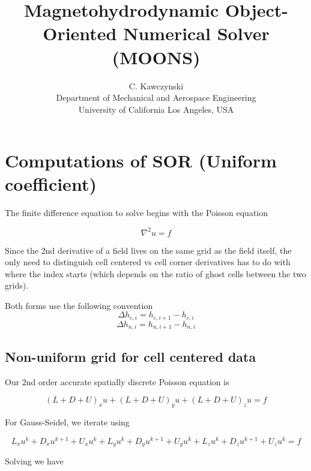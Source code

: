 \documentclass[11pt]{article}
\begin{document}
\doublespacing
\title{Magnetohydrodynamic Object-Oriented Numerical Solver (MOONS)}
\author{C. Kawczynski \\
Department of Mechanical and Aerospace Engineering \\
University of California Los Angeles, USA\\
}
\maketitle

\section{Computations of SOR (Uniform coefficient)}
The finite difference equation to solve begins with the Poisson equation


\begin{equation}
	\nabla^2 u = f
\end{equation}

Since the 2nd derivative of a field lives on the same grid as the field itself, the only need to distinguish cell centered vs cell corner derivatives has to do with where the index starts (which depends on the ratio of ghost cells between the two grids).

Both forms use the following convention
\begin{equation}
	\Delta h_{c,i} = h_{c,i+1} - h_{c,i}
\end{equation}
\begin{equation}
	\Delta h_{n,i} = h_{n,i+1} - h_{n,i}
\end{equation}

\subsection{Non-uniform grid for cell centered data}
Our 2nd order accurate spatially discrete Poisson equation is

\begin{equation}
	(L + D + U)_x u +
	(L + D + U)_y u +
	(L + D + U)_z u
	 = f
\end{equation}

For Gauss-Seidel, we iterate using

\begin{equation}
	L_x u^{k} + D_x u^{k+1} + U_x u^{k} +
	L_y u^{k} + D_y u^{k+1} + U_y u^{k} +
	L_z u^{k} + D_z u^{k+1} + U_z u^{k}
	 = f
\end{equation}

Solving we have
\end{document}
